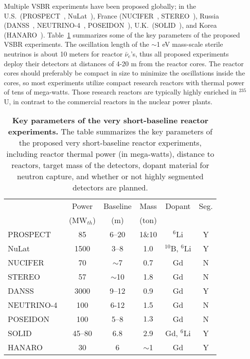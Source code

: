 \documentclass[aps,twocolumn,preprintnumbers,amsmath,superscriptaddress,amssymb,floats,nofootinbib]{revtex4-1}
\begin{document}
Multiple VSBR experiments have been proposed globally; in the U.S.~(PROSPECT~\cite{PROSPECT}, NuLat~\cite{NuLat}), France (NUCIFER~\cite{NUCIFER-2010, NUCIFER-2014}, STEREO~\cite{sterileWP}), Russia (DANSS~\cite{DANSS}, NEUTRINO-4~\cite{NEUTRINO4-2012,NEUTRINO4-2014}, POSEIDON~\cite{POSEIDON}), U.K.~(SOLID~\cite{Lasserre-Neutrino14}), and Korea (HANARO~\cite{HANARO}). 
Table~\ref{tab:sterile} summarizes some of the key parameters of the proposed VSBR experiments. 
The oscillation length of the $\sim$1 eV mass-scale sterile neutrinos is about 10 meters for reactor $\bar\nu_e$'s, thus all proposed experiments deploy their detectors at distances of 4-20 m from the reactor cores. 
The reactor cores should preferably be compact in size to minimize the oscillations inside the cores, 
so most experiments utilize compact research reactors with thermal power of tens of mega-watts. Those research reactors are typically highly enriched in $^{235}$U, in contrast to the commercial reactors in the nuclear power plants. 

\begin{table}[tb]
  \begin{tabular}{lccccc}
  \hline
  & Power & Baseline & Mass & Dopant & Seg. \\
  & (MW$_{th}$) & (m) & (ton) &    & \\
  \hline
  PROSPECT~\cite{PROSPECT}  & 85  & 6--20 & 1\&10  & $^6$Li & Y \\
  NuLat~\cite{NuLat}  & 1500  & 3--8 & 1.0  & $^{10}$B, $^6$Li & Y \\
  NUCIFER~\cite{NUCIFER-2010}   & 70 & $\sim$7  & 0.7 & Gd & N \\
  STEREO~\cite{sterileWP} & 57  & $\sim$10 & 1.8  & Gd & N \\
  DANSS~\cite{DANSS} & 3000  & 9--12  & 0.9  & Gd & Y \\
  NEUTRINO-4~\cite{NEUTRINO4-2012} & 100  & 6-12  & 1.5  & Gd & N \\
  POSEIDON~\cite{POSEIDON} & 100  & 5--8  & $1.3$ & Gd & N \\
  SOLID~\cite{Lasserre-Neutrino14} & 45--80 & 6.8  & 2.9  & Gd, $^6$Li & Y \\
  HANARO~\cite{HANARO} & 30  & 6  & $\sim$1  & Gd & Y \\
  \hline
  \end{tabular}
  \caption{{\bf Key parameters of the very short-baseline reactor experiments.} The table summarizes the key parameters of the proposed very short-baseline reactor experiments, including reactor thermal power (in mega-watts), distance to reactors, target mass of the detectors, dopant material for neutron capture, and whether or not highly segmented detectors are planned.}
\label{tab:sterile}
\end{table}
\end{document}
